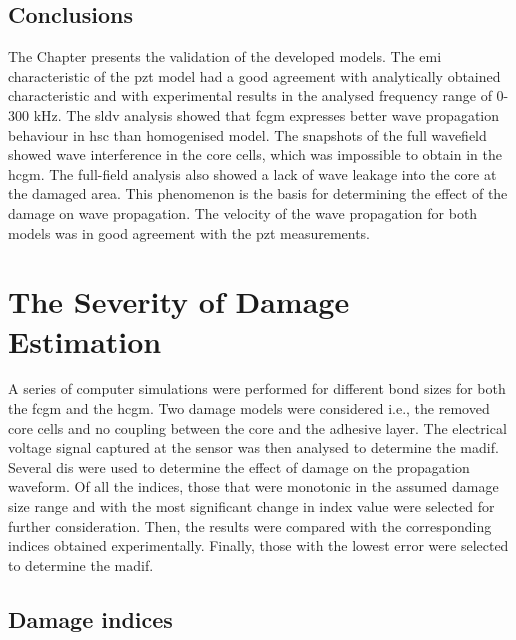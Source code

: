 \documentclass[11pt,a4paper,final]{report}
\theoremstyle{plain}
\begin{document}
\section{Conclusions}
\label{sec:conclusionsValid}

The Chapter presents the validation of the developed models.
The \ac{emi} characteristic of the \ac{pzt} model had a good agreement with analytically obtained characteristic and with experimental results in the analysed frequency range of 0-300 \unit{\kHz}.
The \ac{sldv} analysis showed that \ac{fcgm} expresses better wave propagation behaviour in \ac{hsc} than homogenised model.
The snapshots of the full wavefield showed wave interference in the core cells, which was impossible to obtain in the \ac{hcgm}.
The full-field analysis also showed a lack of wave leakage into the core at the damaged area.
This phenomenon is the basis for determining the effect of the damage on wave propagation.
The velocity of the wave propagation for both models was in good agreement with the \ac{pzt} measurements.\clearpage{}
\clearpage{}\chapter[The Severity of Damage Estimation]{The Severity of Damage Estimation}
\label{ch:severity}

A series of computer simulations were performed for different bond sizes for both the \ac{fcgm} and the \ac{hcgm}.
Two damage models were considered i.e., the removed core cells  and no coupling between the core and the adhesive layer.
The electrical voltage signal captured at the sensor was then analysed to determine the \ac{madif}.
Several \acfp{di} were used to determine the effect of damage on the propagation waveform.
Of all the indices, those that were monotonic in the assumed damage size range and with the most significant change in index value were selected for further consideration.
Then, the results were compared with the corresponding indices obtained experimentally.
Finally, those with the lowest error were selected to determine the \ac{madif}.


\section{Damage indices}
\label{sec:di}
\end{document}
